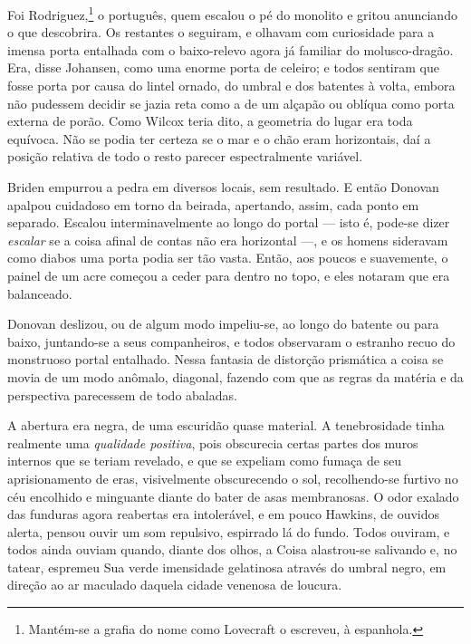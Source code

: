 Foi Rodriguez,\footnote{Mantém-se a grafia do nome como Lovecraft o
  escreveu, à espanhola.} o português, quem escalou o pé do monolito e
gritou anunciando o que descobrira. Os restantes o seguiram, e olhavam
com curiosidade para a imensa porta entalhada com o baixo-relevo agora
já familiar do molusco-dragão. Era, disse Johansen, como uma enorme
porta de celeiro; e todos sentiram que fosse porta por causa do lintel
ornado, do umbral e dos batentes à volta, embora não pudessem decidir se
jazia reta como a de um alçapão ou oblíqua como porta externa de porão.
Como Wilcox teria dito, a geometria do lugar era toda equívoca. Não se
podia ter certeza se o mar e o chão eram horizontais, daí a posição
relativa de todo o resto parecer espectralmente variável.

Briden empurrou a pedra em diversos locais, sem resultado. E então
Donovan apalpou cuidadoso em torno da beirada, apertando, assim, cada
ponto em separado. Escalou interminavelmente ao longo do portal --- isto
é, pode-se dizer \emph{escalar} se a coisa afinal de contas não era
horizontal ---, e os homens sideravam como diabos uma porta podia
ser tão vasta. Então, aos poucos e suavemente, o painel de um acre
começou a ceder para dentro no topo, e eles notaram que era balanceado.

Donovan deslizou, ou de algum modo impeliu-se, ao longo do batente ou
para baixo, juntando-se a seus companheiros, e todos observaram o
estranho recuo do monstruoso portal entalhado. Nessa fantasia de
distorção prismática a coisa se movia de um modo anômalo, diagonal,
fazendo com que as regras da matéria e da perspectiva parecessem de todo
abaladas.

A abertura era negra, de uma escuridão quase material. A tenebrosidade
tinha realmente uma \emph{qualidade positiva}, pois obscurecia certas
partes dos muros internos que se teriam revelado, e que se expeliam como
fumaça de seu aprisionamento de eras, visivelmente obscurecendo o sol,
recolhendo-se furtivo no céu encolhido e minguante diante do bater de
asas membranosas. O odor exalado das funduras agora reabertas era
intolerável, e em pouco Hawkins, de ouvidos alerta, pensou ouvir um som
repulsivo, espirrado lá do fundo. Todos ouviram, e todos ainda ouviam
quando, diante dos olhos, a Coisa alastrou-se salivando e, no tatear,
espremeu Sua verde imensidade gelatinosa através do umbral negro, em
direção ao ar maculado daquela cidade venenosa de loucura.

